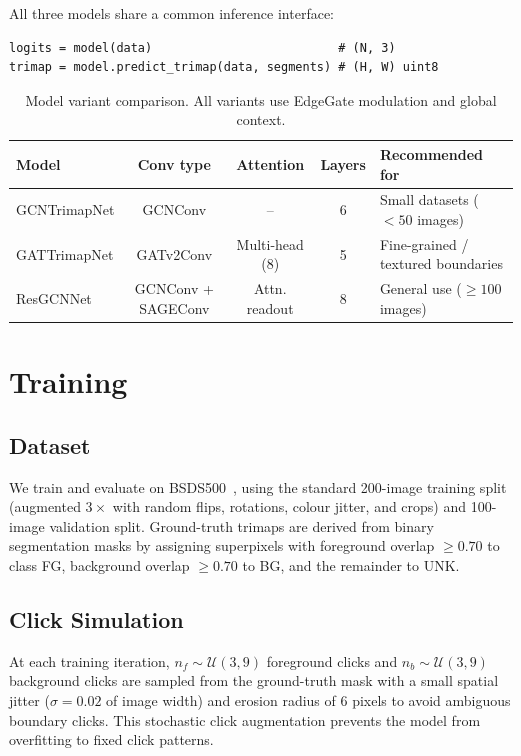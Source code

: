 \documentclass[11pt]{article}
\begin{document}
All three models share a common inference interface:
\begin{verbatim}
logits = model(data)                          # (N, 3)
trimap = model.predict_trimap(data, segments) # (H, W) uint8
\end{verbatim}

\begin{table}[h]
\centering
\small
\begin{tabular}{lcccl}
\toprule
\textbf{Model} & \textbf{Conv type} & \textbf{Attention} & \textbf{Layers} & \textbf{Recommended for} \\
\midrule
GCNTrimapNet & GCNConv            & --             & 6 & Small datasets ($<50$ images) \\
GATTrimapNet & GATv2Conv          & Multi-head (8) & 5 & Fine-grained / textured boundaries \\
ResGCNNet    & GCNConv + SAGEConv & Attn. readout  & 8 & General use ($\geq100$ images) \\
\bottomrule
\end{tabular}
\caption{Model variant comparison. All variants use EdgeGate modulation and global context.}
\label{tab:models}
\end{table}

\section{Training}

\subsection{Dataset}

We train and evaluate on BSDS500~\cite{arbelaez2011contour}, using the standard 200-image
training split (augmented $3\times$ with random flips, rotations, colour jitter, and crops)
and 100-image validation split.
Ground-truth trimaps are derived from binary segmentation masks by assigning superpixels
with foreground overlap $\geq 0.70$ to class FG, background overlap $\geq 0.70$ to BG,
and the remainder to UNK.

\subsection{Click Simulation}

At each training iteration, $n_f \sim \mathcal{U}(3,9)$ foreground clicks and
$n_b \sim \mathcal{U}(3,9)$ background clicks are sampled from the ground-truth mask with
a small spatial jitter ($\sigma = 0.02$ of image width) and erosion radius of 6 pixels
to avoid ambiguous boundary clicks.
This stochastic click augmentation prevents the model from overfitting to fixed click patterns.
\end{document}

